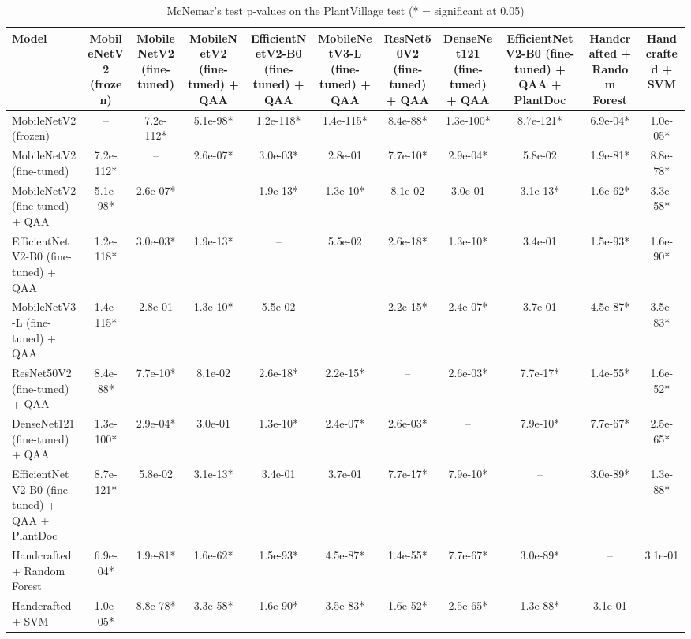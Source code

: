 \begin{table}[t]
\centering
\small
\caption{McNemar's test p-values on the PlantVillage test (* = significant at 0.05)}
\label{tab:table_mcnemar_pv}
\begin{tabular}{lcccccccccc}
\toprule
Model & MobileNetV2 (frozen) & MobileNetV2 (fine-tuned) & MobileNetV2 (fine-tuned) + QAA & EfficientNetV2-B0 (fine-tuned) + QAA & MobileNetV3-L (fine-tuned) + QAA & ResNet50V2 (fine-tuned) + QAA & DenseNet121 (fine-tuned) + QAA & EfficientNetV2-B0 (fine-tuned) + QAA + PlantDoc & Handcrafted + Random Forest & Handcrafted + SVM \\
\midrule
MobileNetV2 (frozen) & – & 7.2e-112* & 5.1e-98* & 1.2e-118* & 1.4e-115* & 8.4e-88* & 1.3e-100* & 8.7e-121* & 6.9e-04* & 1.0e-05* \\
MobileNetV2 (fine-tuned) & 7.2e-112* & – & 2.6e-07* & 3.0e-03* & 2.8e-01 & 7.7e-10* & 2.9e-04* & 5.8e-02 & 1.9e-81* & 8.8e-78* \\
MobileNetV2 (fine-tuned) + QAA & 5.1e-98* & 2.6e-07* & – & 1.9e-13* & 1.3e-10* & 8.1e-02 & 3.0e-01 & 3.1e-13* & 1.6e-62* & 3.3e-58* \\
EfficientNetV2-B0 (fine-tuned) + QAA & 1.2e-118* & 3.0e-03* & 1.9e-13* & – & 5.5e-02 & 2.6e-18* & 1.3e-10* & 3.4e-01 & 1.5e-93* & 1.6e-90* \\
MobileNetV3-L (fine-tuned) + QAA & 1.4e-115* & 2.8e-01 & 1.3e-10* & 5.5e-02 & – & 2.2e-15* & 2.4e-07* & 3.7e-01 & 4.5e-87* & 3.5e-83* \\
ResNet50V2 (fine-tuned) + QAA & 8.4e-88* & 7.7e-10* & 8.1e-02 & 2.6e-18* & 2.2e-15* & – & 2.6e-03* & 7.7e-17* & 1.4e-55* & 1.6e-52* \\
DenseNet121 (fine-tuned) + QAA & 1.3e-100* & 2.9e-04* & 3.0e-01 & 1.3e-10* & 2.4e-07* & 2.6e-03* & – & 7.9e-10* & 7.7e-67* & 2.5e-65* \\
EfficientNetV2-B0 (fine-tuned) + QAA + PlantDoc & 8.7e-121* & 5.8e-02 & 3.1e-13* & 3.4e-01 & 3.7e-01 & 7.7e-17* & 7.9e-10* & – & 3.0e-89* & 1.3e-88* \\
Handcrafted + Random Forest & 6.9e-04* & 1.9e-81* & 1.6e-62* & 1.5e-93* & 4.5e-87* & 1.4e-55* & 7.7e-67* & 3.0e-89* & – & 3.1e-01 \\
Handcrafted + SVM & 1.0e-05* & 8.8e-78* & 3.3e-58* & 1.6e-90* & 3.5e-83* & 1.6e-52* & 2.5e-65* & 1.3e-88* & 3.1e-01 & – \\
\bottomrule
\end{tabular}
\end{table}
